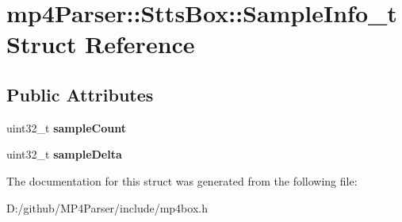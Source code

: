 \hypertarget{structmp4_parser_1_1_stts_box_1_1_sample_info__t}{}\section{mp4\+Parser\+::Stts\+Box\+::Sample\+Info\+\_\+t Struct Reference}
\label{structmp4_parser_1_1_stts_box_1_1_sample_info__t}
\subsection*{Public Attributes}
\begin{DoxyCompactItemize}
\item 
\mbox{\label{structmp4_parser_1_1_stts_box_1_1_sample_info__t_a7e43a89443cf94ce53f3222bf7170554}} 
uint32\+\_\+t {\bfseries sample\+Count}
\item 
\mbox{\label{structmp4_parser_1_1_stts_box_1_1_sample_info__t_a211cf2a5260f3ce63638049b5a3df237}} 
uint32\+\_\+t {\bfseries sample\+Delta}
\end{DoxyCompactItemize}


The documentation for this struct was generated from the following file\+:\begin{DoxyCompactItemize}
\item 
D\+:/github/\+M\+P4\+Parser/include/mp4box.\+h\end{DoxyCompactItemize}

